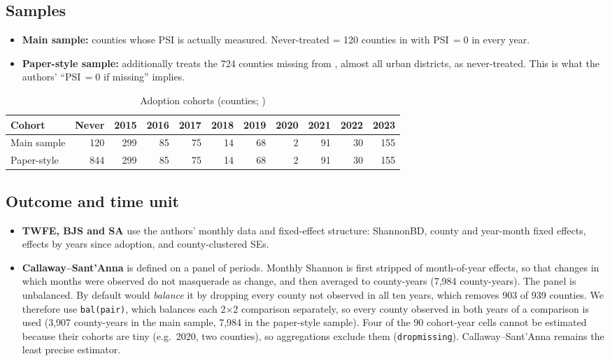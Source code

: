 \documentclass[11pt]{article}
\begin{document}
\subsection{Samples}
\begin{itemize}
\item \textbf{Main sample:} counties whose PSI is actually measured. Never-treated = 120 counties in  with PSI\,$=0$ in every year.
\item \textbf{Paper-style sample:} additionally treats the 724 counties missing from , almost all urban districts, as never-treated. This is what the authors' ``PSI\,$=0$ if missing'' implies.
\end{itemize}

\begin{table}[H]\centering\small
\caption{Adoption cohorts (counties; )}
\begin{adjustbox}{max width=\linewidth}
\begin{tabular}{lrrrrrrrrrr}
\toprule
Cohort & Never & 2015 & 2016 & 2017 & 2018 & 2019 & 2020 & 2021 & 2022 & 2023\\
\midrule
Main sample & 120 & 299 & 85 & 75 & 14 & 68 & 2 & 91 & 30 & 155\\
Paper-style & 844 & 299 & 85 & 75 & 14 & 68 & 2 & 91 & 30 & 155\\
\bottomrule
\end{tabular}
\end{adjustbox}
\end{table}

\subsection{Outcome and time unit}
\begin{itemize}
\item \textbf{TWFE, BJS and SA} use the authors' monthly data and fixed-effect structure: ShannonBD, county and year-month fixed effects, effects by years since adoption, and county-clustered SEs.
\item \textbf{Callaway--Sant'Anna} is defined on a panel of periods. Monthly Shannon is first stripped of month-of-year effects, so that changes in which months were observed do not masquerade as change, and then averaged to county-years (7,984 county-years). The panel is unbalanced. By default  would \emph{balance} it by dropping every county not observed in all ten years, which removes 903 of 939 counties. We therefore use \texttt{bal(pair)}, which balances each 2$\times$2 comparison separately, so every county observed in both years of a comparison is used (3,907 county-years in the main sample, 7,984 in the paper-style sample). Four of the 90 cohort-year cells cannot be estimated because their cohorts are tiny (e.g.\ 2020, two counties), so aggregations exclude them (\texttt{dropmissing}). Callaway--Sant'Anna remains the least precise estimator.
\end{itemize}
\end{document}
